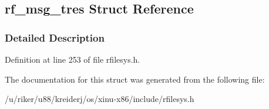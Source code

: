 \hypertarget{structrf__msg__tres}{}\subsection{rf\+\_\+msg\+\_\+tres Struct Reference}
\label{structrf__msg__tres}


\subsubsection{Detailed Description}


Definition at line 253 of file rfilesys.\+h.



The documentation for this struct was generated from the following file\+:\begin{DoxyCompactItemize}
\item 
/u/riker/u88/kreiderj/os/xinu-\/x86/include/rfilesys.\+h\end{DoxyCompactItemize}
